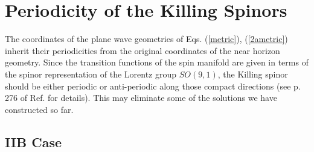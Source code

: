 \documentclass[a4paper,12pt]{article}
\begin{document}
\section{Periodicity of the Killing Spinors}\label{vi}

The coordinates of the plane wave geometries of Eqs. (\ref{metric}), (\ref{2ametric}) inherit their periodicities from the original coordinates of the near horizon geometry. Since the transition functions of the spin manifold are given in terms of the spinor representation of the Lorentz group $SO(9,1)$, the Killing spinor should be either periodic or anti-periodic along those compact directions (see p. 276 of Ref. \cite{gsw} for details). This may eliminate some of the solutions we have constructed so far.

\subsection{IIB Case}
\end{document}

